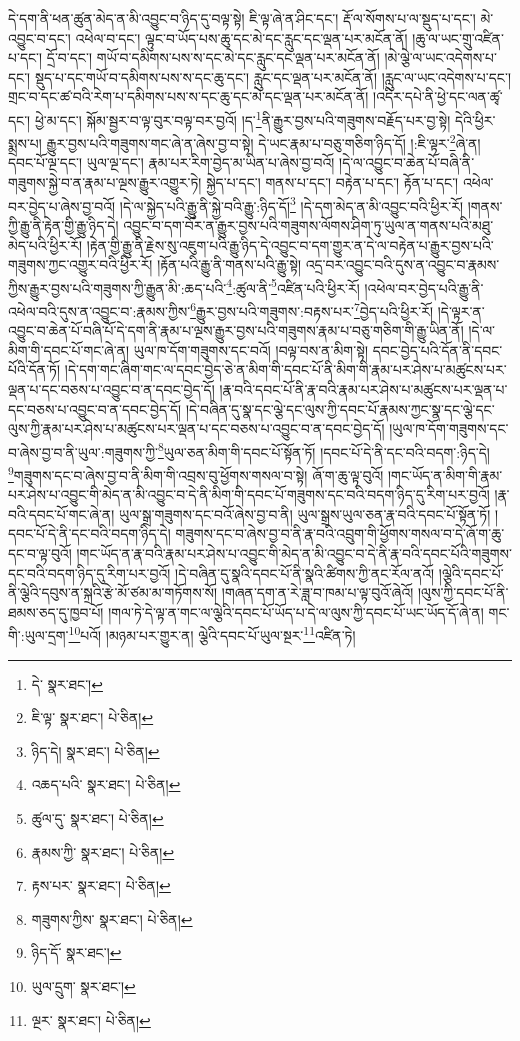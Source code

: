 དེ་དག་ནི་ཕན་ཚུན་མེད་ན་མི་འབྱུང་བ་ཉིད་དུ་བལྟ་སྟེ། ཇི་ལྟ་ཞེ་ན་ཤིང་དང་། རྡོ་ལ་སོགས་པ་ལ་སྡུད་པ་དང་། མེ་འབྱུང་བ་དང་། འཕེལ་བ་དང་། ལྟུང་བ་ཡོད་པས་ཆུ་དང་མེ་དང་རླུང་དང་ལྡན་པར་མངོན་ནོ། །ཆུ་ལ་ཡང་གྲུ་འཛིན་པ་དང་། དྲོ་བ་དང་། གཡོ་བ་དམིགས་པས་ས་དང་མེ་དང་རླུང་དང་ལྡན་པར་མངོན་ནོ། །མེ་ལྕེ་ལ་ཡང་འདེགས་པ་དང་། སྡུད་པ་དང་གཡོ་བ་དམིགས་པས་ས་དང་ཆུ་དང་། རླུང་དང་ལྡན་པར་མངོན་ནོ། །རླུང་ལ་ཡང་འདེགས་པ་དང་། གྲང་བ་དང་ཚ་བའི་རེག་པ་དམིགས་པས་ས་དང་ཆུ་དང་མེ་དང་ལྡན་པར་མངོན་ནོ། །འདིར་དཔེ་ནི་ཕྱེ་དང་ལན་ཚྭ་དང་། ཕྱེ་མ་དང་། སྐོམ་སྦྱར་བ་ལྟ་བུར་བལྟ་བར་བྱའོ། །ད་\footnote{དེ་  སྣར་ཐང་། }ནི་རྒྱུར་བྱས་པའི་གཟུགས་བརྗོད་པར་བྱ་སྟེ། དེའི་ཕྱིར་སྨྲས་པ། རྒྱུར་བྱས་པའི་གཟུགས་གང་ཞེ་ན་ཞེས་བྱ་བ་སྟེ། དེ་ཡང་རྣམ་པ་བཅུ་གཅིག་ཉིད་དོ། །:ཇི་ལྟར་\footnote{ཇི་ལྟ་  སྣར་ཐང་།  པེ་ཅིན། }ཞེ་ན། དབང་པོ་ལྔ་དང་། ཡུལ་ལྔ་དང་། རྣམ་པར་རིག་བྱེད་མ་ཡིན་པ་ཞེས་བྱ་བའོ། །དེ་ལ་འབྱུང་བ་ཆེན་པོ་བཞི་ནི་གཟུགས་སྐྱེ་བ་ན་རྣམ་པ་ལྔས་རྒྱུར་འགྱུར་ཏེ། སྐྱེད་པ་དང་། གནས་པ་དང་། བརྟེན་པ་དང་། རྟོན་པ་དང་། འཕེལ་བར་བྱེད་པ་ཞེས་བྱ་བའོ། །དེ་ལ་སྐྱེད་པའི་རྒྱུ་ནི་སྐྱེ་བའི་རྒྱུ་:ཉིད་དོ།\footnote{ཉིད་དེ།  སྣར་ཐང་།  པེ་ཅིན། } །དེ་དག་མེད་ན་མི་འབྱུང་བའི་ཕྱིར་རོ། །གནས་ཀྱི་རྒྱུ་ནི་རྟེན་གྱི་རྒྱུ་ཉིད་དེ། འབྱུང་བ་དག་བོར་ན་རྒྱུར་བྱས་པའི་གཟུགས་ལོགས་ཤིག་ཏུ་ཡུལ་ན་གནས་པའི་མཐུ་མེད་པའི་ཕྱིར་རོ། །རྟེན་གྱི་རྒྱུ་ནི་རྗེས་སུ་འཇུག་པའི་རྒྱུ་ཉིད་དེ་འབྱུང་བ་དག་གྱུར་ན་དེ་ལ་བརྟེན་པ་རྒྱུར་བྱས་པའི་གཟུགས་ཀྱང་འགྱུར་བའི་ཕྱིར་རོ། །རྟོན་པའི་རྒྱུ་ནི་གནས་པའི་རྒྱུ་སྟེ། འདྲ་བར་འབྱུང་བའི་དུས་ན་འབྱུང་བ་རྣམས་ཀྱིས་རྒྱུར་བྱས་པའི་གཟུགས་ཀྱི་རྒྱུན་མི་:ཆད་པའི་\footnote{འཆད་པའི་  སྣར་ཐང་།  པེ་ཅིན། }:ཚུལ་ནི་\footnote{ཚུལ་དུ་  སྣར་ཐང་།  པེ་ཅིན། }འཛིན་པའི་ཕྱིར་རོ། །འཕེལ་བར་བྱེད་པའི་རྒྱུ་ནི་འཕེལ་བའི་དུས་ན་འབྱུང་བ་:རྣམས་ཀྱིས་\footnote{རྣམས་ཀྱི་  སྣར་ཐང་།  པེ་ཅིན། }རྒྱུར་བྱས་པའི་གཟུགས་:བརྟས་པར་\footnote{རྟས་པར་  སྣར་ཐང་།  པེ་ཅིན། }བྱེད་པའི་ཕྱིར་རོ། །དེ་ལྟར་ན་འབྱུང་བ་ཆེན་པོ་བཞི་པོ་དེ་དག་ནི་རྣམ་པ་ལྔས་རྒྱུར་བྱས་པའི་གཟུགས་རྣམ་པ་བཅུ་གཅིག་གི་རྒྱུ་ཡིན་ནོ། །དེ་ལ་མིག་གི་དབང་པོ་གང་ཞེ་ན། ཡུལ་ཁ་དོག་གཟུགས་དང་བའོ། །བལྟ་བས་ན་མིག་སྟེ། དབང་བྱེད་པའི་དོན་ནི་དབང་པོའི་དོན་ཏོ། །དེ་དག་གང་ཞིག་གང་ལ་དབང་བྱེད་ཅེ་ན་མིག་གི་དབང་པོ་ནི་མིག་གི་རྣམ་པར་ཤེས་པ་མཚུངས་པར་ལྡན་པ་དང་བཅས་པ་འབྱུང་བ་ན་དབང་བྱེད་དོ། །རྣ་བའི་དབང་པོ་ནི་རྣ་བའི་རྣམ་པར་ཤེས་པ་མཚུངས་པར་ལྡན་པ་དང་བཅས་པ་འབྱུང་བ་ན་དབང་བྱེད་དོ། །དེ་བཞིན་དུ་སྣ་དང་ལྕེ་དང་ལུས་ཀྱི་དབང་པོ་རྣམས་ཀྱང་སྣ་དང་ལྕེ་དང་ལུས་ཀྱི་རྣམ་པར་ཤེས་པ་མཚུངས་པར་ལྡན་པ་དང་བཅས་པ་འབྱུང་བ་ན་དབང་བྱེད་དོ། །ཡུལ་ཁ་དོག་གཟུགས་དང་བ་ཞེས་བྱ་བ་ནི་ཡུལ་:གཟུགས་ཀྱི་\footnote{གཟུགས་ཀྱིས་  སྣར་ཐང་།  པེ་ཅིན། }ཡུལ་ཅན་མིག་གི་དབང་པོ་སྟོན་ཏོ། །དབང་པོ་དེ་ནི་དང་བའི་བདག་:ཉིད་དེ། \footnote{ཉིད་དོ་  སྣར་ཐང་། }གཟུགས་དང་བ་ཞེས་བྱ་བ་ནི་མིག་གི་འབྲས་བུ་ཕྱོགས་གསལ་བ་སྟེ། ཞོ་ག་ཆུ་ལྟ་བུའོ། །གང་ཡོད་ན་མིག་གི་རྣམ་པར་ཤེས་པ་འབྱུང་གི་མེད་ན་མི་འབྱུང་བ་དེ་ནི་མིག་གི་དབང་པོ་གཟུགས་དང་བའི་བདག་ཉིད་དུ་རིག་པར་བྱའོ། །རྣ་བའི་དབང་པོ་གང་ཞེ་ན། ཡུལ་སྒྲ་གཟུགས་དང་བའོ་ཞེས་བྱ་བ་ནི། ཡུལ་སྒྲས་ཡུལ་ཅན་རྣ་བའི་དབང་པོ་སྟོན་ཏོ། །དབང་པོ་དེ་ནི་དང་བའི་བདག་ཉིད་དེ། གཟུགས་དང་བ་ཞེས་བྱ་བ་ནི་རྣ་བའི་འབྲུག་གི་ཕྱོགས་གསལ་བ་དེ་ཞོ་ག་ཆུ་དང་བ་ལྟ་བུའོ། །གང་ཡོད་ན་རྣ་བའི་རྣམ་པར་ཤེས་པ་འབྱུང་གི་མེད་ན་མི་འབྱུང་བ་དེ་ནི་རྣ་བའི་དབང་པོའི་གཟུགས་དང་བའི་བདག་ཉིད་དུ་རིག་པར་བྱའོ། །དེ་བཞིན་དུ་སྣའི་དབང་པོ་ནི་སྣའི་ཚིགས་ཀྱི་ནང་རོལ་ནའོ། །ལྕེའི་དབང་པོ་ནི་ལྕེའི་དབུས་ན་སྐྲའི་རྩེ་མོ་ཙམ་མ་གཏོགས་སོ། །གཞན་དག་ན་རེ་ཟླ་བ་ཁམ་པ་ལྟ་བུའོ་ཞེའོ། །ལུས་ཀྱི་དབང་པོ་ནི་ཐམས་ཅད་དུ་ཁྱབ་པོ། །གལ་ཏེ་དེ་ལྟ་ན་གང་ལ་ལྕེའི་དབང་པོ་ཡོད་པ་དེ་ལ་ལུས་ཀྱི་དབང་པོ་ཡང་ཡོད་དོ་ཞེ་ན། གང་གི་:ཡུལ་དྲག་\footnote{ཡུལ་དྲུག་  སྣར་ཐང་། }པའོ། །མཉམ་པར་གྱུར་ན། ལྕེའི་དབང་པོ་ཡུལ་སྔར་\footnote{ལྔར་  སྣར་ཐང་།  པེ་ཅིན། }འཛིན་ཏེ། 